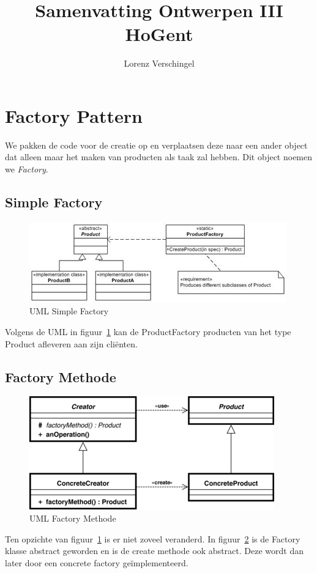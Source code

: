 \documentclass[a4paper,12pt]{article}
\title{Samenvatting Ontwerpen III \\ \large HoGent}
\author{Lorenz Verschingel}
\begin{document}
\maketitle
\section{Factory Pattern}
We pakken de code voor de creatie op en verplaatsen deze naar een ander object dat alleen maar het maken van producten als taak zal hebben.
Dit object noemen we \textit{Factory}.

\subsection{Simple Factory}
\begin{figure}[H]
\centering
  	\includegraphics[width=.5\linewidth]{img/Factory/SimpleFactory.jpg}
  	\caption{UML Simple Factory}
  	\label{fig:SimpleFactory}
\end{figure}

Volgens de UML in figuur~\ref{fig:SimpleFactory} kan de ProductFactory producten van het type Product afleveren aan zijn cliënten.

\subsection{Factory Methode}
\begin{figure}[H]
\centering
  	\includegraphics[width=.5\linewidth]{img/Factory/FactoryMethod.png}
  	\caption{UML Factory Methode}
  	\label{fig:FactoryMethod}
\end{figure}

Ten opzichte van figuur~\ref{fig:SimpleFactory} is er niet zoveel veranderd.
In figuur~\ref{fig:FactoryMethod} is de Factory klasse abstract geworden en is de create methode ook abstract.
Deze wordt dan later door een concrete factory geïmplementeerd.
\end{document}
